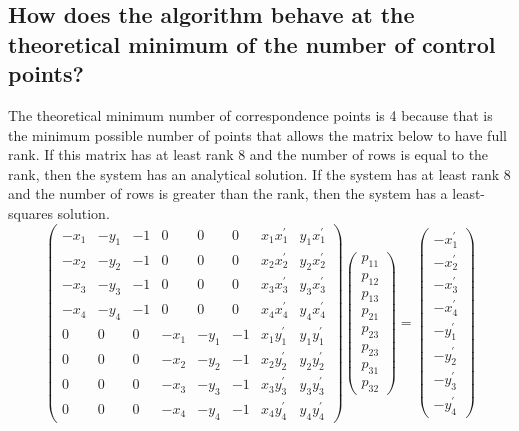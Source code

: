 \documentclass[]{article}
\begin{document}
	\subsection{How does the algorithm behave at the theoretical minimum of the number of control points?}
		The theoretical minimum number of correspondence points is 4 because that is the minimum possible number of points that allows the matrix below to have full rank. If this matrix has at least rank 8 and the number of rows is equal to the rank, then the system has an analytical solution. If the system has at least rank 8 and the number of rows is greater than the rank, then the system has a least-squares solution.
		\[\left(\begin{array}{cccccccc}
			-x_{1} & -y_{1} & -1 & 0 & 0 & 0 & x_{1} x_{1}^{\prime} & y_{1} x_{1}^{\prime} \\
			-x_{2} & -y_{2} & -1 & 0 & 0 & 0 & x_{2} x_{2}^{\prime} & y_{2} x_{2}^{\prime} \\
			-x_{3} & -y_{3} & -1 & 0 & 0 & 0 & x_{3} x_{3}^{\prime} & y_{3} x_{3}^{\prime} \\
			-x_{4} & -y_{4} & -1 & 0 & 0 & 0 & x_{4} x_{4}^{\prime} & y_{4} x_{4}^{\prime} \\
			0 & 0 & 0 & -x_{1} & -y_{1} & -1 & x_{1} y_{1}^{\prime} & y_{1} y_{1}^{\prime} \\
			0 & 0 & 0 & -x_{2} & -y_{2} & -1 & x_{2} y_{2}^{\prime} & y_{2} y_{2}^{\prime} \\
			0 & 0 & 0 & -x_{3} & -y_{3} & -1 & x_{3} y_{3}^{\prime} & y_{3} y_{3}^{\prime} \\
			0 & 0 & 0 & -x_{4} & -y_{4} & -1 & x_{4} y_{4}^{\prime} & y_{4} y_{4}^{\prime}
		\end{array}\right)\left(\begin{array}{c}
			p_{11} \\
			p_{12} \\
			p_{13} \\
			p_{21} \\
			p_{23} \\
			p_{23} \\
			p_{31} \\
			p_{32}
		\end{array}\right)=\left(\begin{array}{c}
			-x_{1}^{\prime} \\
			-x_{2}^{\prime} \\
			-x_{3}^{\prime} \\
			-x_{4}^{\prime} \\
			-y_{1}^{\prime} \\
			-y_{2}^{\prime} \\
			-y_{3}^{\prime} \\
			-y_{4}^{\prime}
		\end{array}\right)\]
	
\end{document}
